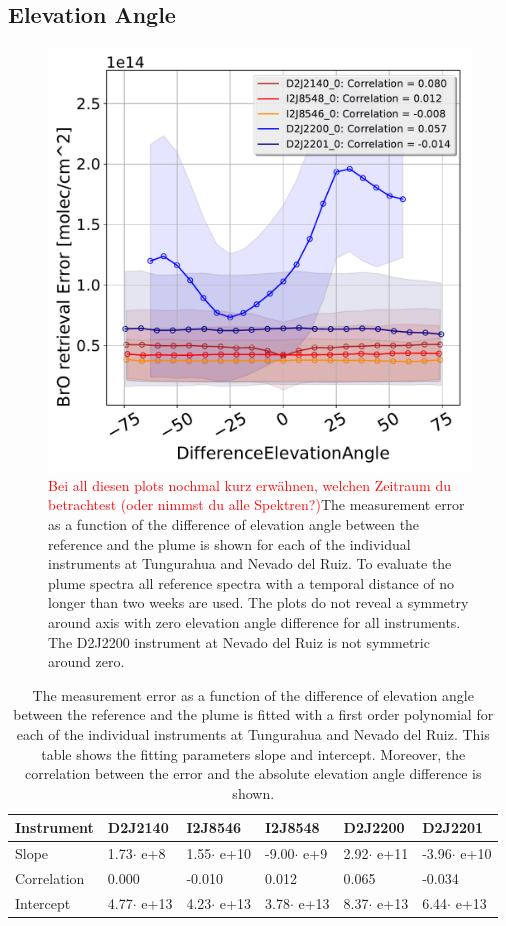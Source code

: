 \subsection{Elevation Angle}

\begin{figure}
	\centering
	\includegraphics[width=0.7\linewidth]{Bilder/DiffElevAngleallInstruments}
	\caption{\textcolor{red}{Bei all diesen plots nochmal kurz erwähnen, welchen Zeitraum du betrachtest (oder nimmst du alle Spektren?)}The  measurement error as a function of the difference of elevation angle between the reference and the plume is shown for each of the individual instruments at Tungurahua and Nevado del Ruiz. To evaluate the plume spectra all reference spectra with a temporal distance of no longer than two weeks are used. The plots do not reveal a symmetry around axis with zero elevation angle difference for all instruments. The D2J2200 instrument at Nevado del Ruiz is not symmetric around zero.}
	\label{fig:diffeleangle}
\end{figure}
\begin{table}[h]
	\centering
	\begin{tabular}{|p{2cm}|p{2cm}|p{2cm}|p{2cm}|p{2cm}|p{2cm}|}
		Instrument	&D2J2140&I2J8546& I2J8548&D2J2200&D2J2201\\
		\toprule
		Slope& 1.73$\cdot$ e+8& 1.55$\cdot$ e+10  &-9.00$\cdot$ e+9 &2.92$\cdot$ e+11&-3.96$\cdot$ e+10\\
		\midrule
		Correlation&
		0.000&
		-0.010&
		0.012&
		0.065&
		-0.034\\
		\midrule
		Intercept&4.77$\cdot$ e+13&4.23$\cdot$ e+13&3.78$\cdot$ e+13&8.37$\cdot$ e+13 &6.44$\cdot$ e+13 \\
		\bottomrule
	\end{tabular}
	\caption{The  measurement error as a function of the difference of elevation angle between the reference and the plume is fitted with a first order polynomial for each of the individual instruments at Tungurahua and Nevado del Ruiz. This table shows the fitting parameters slope and intercept. Moreover, the correlation between the  error and the absolute elevation angle difference is shown. }
\end{table}
